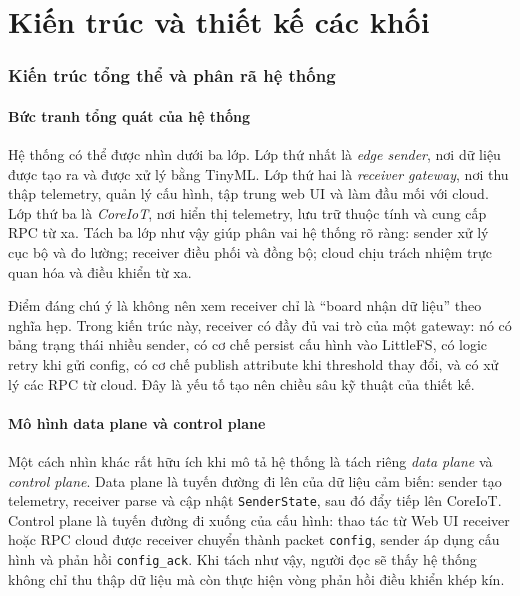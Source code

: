 \documentclass[12pt,a4paper]{report}
\begin{document}

\part{Kiến trúc và thiết kế các khối}

\section{Kiến trúc tổng thể và phân rã hệ thống}

\subsection{Bức tranh tổng quát của hệ thống}
Hệ thống có thể được nhìn dưới ba lớp. Lớp thứ nhất là \textit{edge sender}, nơi dữ liệu được tạo ra và được xử lý bằng TinyML. Lớp thứ hai là \textit{receiver gateway}, nơi thu thập telemetry, quản lý cấu hình, tập trung web UI và làm đầu mối với cloud. Lớp thứ ba là \textit{CoreIoT}, nơi hiển thị telemetry, lưu trữ thuộc tính và cung cấp RPC từ xa. Tách ba lớp như vậy giúp phân vai hệ thống rõ ràng: sender xử lý cục bộ và đo lường; receiver điều phối và đồng bộ; cloud chịu trách nhiệm trực quan hóa và điều khiển từ xa.

Điểm đáng chú ý là không nên xem receiver chỉ là “board nhận dữ liệu” theo nghĩa hẹp. Trong kiến trúc này, receiver có đầy đủ vai trò của một gateway: nó có bảng trạng thái nhiều sender, có cơ chế persist cấu hình vào LittleFS, có logic retry khi gửi config, có cơ chế publish attribute khi threshold thay đổi, và có xử lý các RPC từ cloud. Đây là yếu tố tạo nên chiều sâu kỹ thuật của thiết kế.

\subsection{Mô hình data plane và control plane}
Một cách nhìn khác rất hữu ích khi mô tả hệ thống là tách riêng \textit{data plane} và \textit{control plane}. Data plane là tuyến đường đi lên của dữ liệu cảm biến: sender tạo telemetry, receiver parse và cập nhật \texttt{SenderState}, sau đó đẩy tiếp lên CoreIoT. Control plane là tuyến đường đi xuống của cấu hình: thao tác từ Web UI receiver hoặc RPC cloud được receiver chuyển thành packet \texttt{config}, sender áp dụng cấu hình và phản hồi \texttt{config\_ack}. Khi tách như vậy, người đọc sẽ thấy hệ thống không chỉ thu thập dữ liệu mà còn thực hiện vòng phản hồi điều khiển khép kín.
\end{document}
